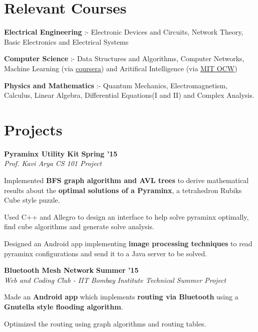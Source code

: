 \documentclass[11pt]{resume}
\begin{document}
\begin{resume}
\section{\mysidestyle Relevant Courses}
\begin{list2}
\item \textbf {Electrical Engineering} :- Electronic Devices and Circuits, Network Theory, Basic Electronics and Electrical Systems 
\item \textbf {Computer Science} :- Data Structures and Algorithms, Computer Networks, Machine Learning (via \href{https://coursera.org}{coursera}) and Aritifical Intelligence (via \href{https://ocw.mit.edu/courses/electrical-engineering-and-computer-science/6-034-artificial-intelligence-fall-2010/}{MIT OCW})
\item \textbf {Physics and Mathematics} :- Quantum Mechanics, Electromagnetism, Calculus, Linear Algebra, Differential Equations(I and II) and Complex Analysis.
\end{list2}

\vspace{-1em}

\section{\mysidestyle Projects}
\textbf{Pyraminx Utility Kit} \hfill \textbf{Spring '15}\\
\textsl{Prof. Kavi Arya} \hfill \textsl{CS 101 Project}\\
\vspace{-4mm}
\begin{list2}
\item Implemented \textbf{BFS graph algorithm and AVL trees} to derive mathematical results about the \textbf{optimal solutions of a Pyraminx}, a tetrahedron Rubiks Cube style puzzle.
\item Used C++ and Allegro to design an interface to help solve pyraminx optimally, find cube algorithms and generate solve analysis.
\item Designed an Android app implementing \textbf{image processing techniques} to read pyraminx configurations and send it to a Java server to be solved.
\end{list2}
\textbf{Bluetooth Mesh Network} \hfill \textbf{Summer '15}\\
\textsl{Web and Coding Club - IIT Bombay} \hfill \textsl{Institute Technical Summer Project}\\
\vspace{-4mm}
\begin{list2}
\item Made an \textbf{Android app} which implements \textbf{routing via Bluetooth} using a \textbf{Gnutella style flooding algorithm}.
\item Optimized the routing using graph algorithms and routing tables.
\end{list2}
\pagebreak


\end{resume}
\end{document}
